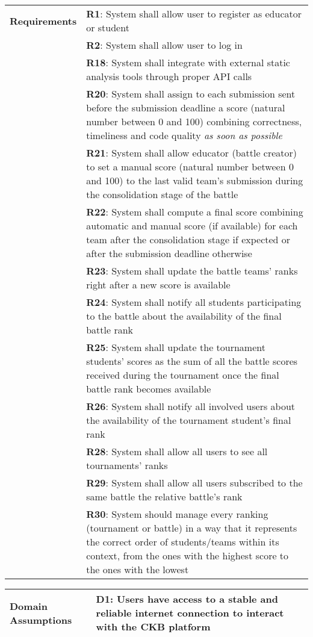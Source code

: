 \begin{center}
    \begin{tabular}{ |m{3cm}|m{10cm}| }
        \hline
        \textbf{Requirements} 
        & \textbf{R1}: System shall allow user to register as educator or student \\
        & \textbf{R2}: System shall allow user to log in \\
        & \textbf{R18}: System shall integrate with external static analysis tools through proper API calls \\
        & \textbf{R20}: System shall assign to each submission sent before the submission deadline a score (natural number between 0 and 100) combining correctness, timeliness and code quality \textit{as soon as possible} \\
        & \textbf{R21}: System shall allow educator (battle creator) to set a manual score (natural number between 0 and 100) to the last valid team’s submission during the consolidation stage of the battle \\
        & \textbf{R22}: System shall compute a final score combining automatic and manual score (if available) for each team after the consolidation stage if expected or after the submission deadline otherwise \\
        & \textbf{R23}: System shall update the battle teams’ ranks right after a new score is available \\
        & \textbf{R24}: System shall notify all students participating to the battle about the availability of the final battle rank \\
        & \textbf{R25}: System shall update the tournament students’ scores as the sum of all the battle scores received during the tournament once the final battle rank becomes available \\
        & \textbf{R26}: System shall notify all involved users about the availability of the tournament student’s final rank \\
        & \textbf{R28}: System shall allow all users to see all tournaments’ ranks \\
        & \textbf{R29}: System shall allow all users subscribed to the same battle the relative battle's rank \\
        & \textbf{R30}: System should manage every ranking (tournament or battle) in a way that it represents the correct order of students/teams within its context, from the ones with the highest score to the ones with the lowest \\    
        \hline
    \end{tabular}
    \begin{tabular}{ |m{3cm}|m{10cm}| }
        \hline
        \textbf{Domain \newline Assumptions} 
        & \textbf{D1}: Users have access to a stable and reliable internet connection to interact with the CKB platform \\
        \hline
    \end{tabular}
\end{center} 

